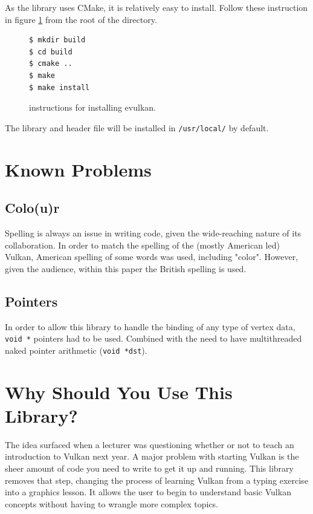 \documentclass[12pt]{report}
\theoremstyle{definition}
\begin{document}
        As the library uses CMake, it is relatively easy to install. Follow
        these instruction in figure \ref{fig:installation} from the root of the directory.

          \begin{figure}
            \centering
            \begin{verbatim}
$ mkdir build
$ cd build
$ cmake ..
$ make
$ make install
            \end{verbatim}
            \caption{instructions for installing evulkan.}
            \label{fig:installation}
          \end{figure}

        The library and header file will be installed in \texttt{/usr/local/} by default.

    \section{Known Problems}

      \subsection{Colo(u)r}

        Spelling is always an issue in writing code, given the wide-reaching
        nature of its collaboration. In order to match the spelling of the
        (mostly American led) Vulkan, American spelling of some words was used,
        including "color". However, given the audience, within this paper the
        British spelling is used.

      \subsection{Pointers}

        In order to allow this library to handle the binding of any type of
        vertex data, \verb|void *| pointers had to be used. Combined with the need to
        have multithreaded naked pointer arithmetic (\verb|void *dst|).

    \section{Why Should You Use This Library?}

      The idea surfaced when a lecturer was questioning whether or not to teach
      an introduction to Vulkan next year. A major problem with starting Vulkan
      is the sheer amount of code you need to write to get it up and running.
      This library removes that step, changing the process of learning Vulkan
      from a typing exercise into a graphics lesson. It allows the user to
      begin to understand basic Vulkan concepts without having to wrangle more
      complex topics. \\
\end{document}
